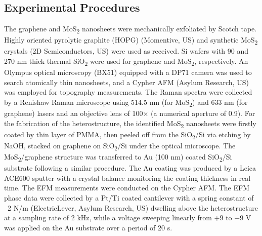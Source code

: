\subsection{Experimental Procedures}
\label{sec:asym-exper-proc}

The graphene and MoS\textsubscript{2} nanosheets were mechanically exfoliated by Scotch tape. Highly oriented pyrolytic graphite (HOPG) (Momentive, US) and synthetic MoS\textsubscript{2} crystals (2D Semiconductors, US) were used as received. Si wafers with 90 and 270 nm thick thermal SiO\textsubscript{2} were used for graphene and MoS\textsubscript{2}, respectively. An Olympus optical microscopy (BX51) equipped with a DP71 camera was used to search atomically thin nanosheets, and a Cypher AFM (Asylum Research, US) was employed for topography measurements. The Raman spectra were collected by a Renishaw Raman microscope using 514.5 nm (for MoS\textsubscript{2}) and 633 nm (for graphene) lasers and an objective lens of 100× (a numerical aperture of 0.9). For the fabrication of the heterostructure, the identified MoS\textsubscript{2} nanosheets were firstly coated by thin layer of PMMA, then peeled off from the SiO\textsubscript{2}/Si via etching by NaOH, stacked on graphene on SiO\textsubscript{2}/Si under the optical microscope. The MoS\textsubscript{2}/graphene structure was transferred to Au (100 nm) coated SiO\textsubscript{2}/Si substrate following a similar procedure. The Au coating was produced by a Leica ACE600 sputter with a crystal balance monitoring the coating thickness in real time. The EFM measurements were conducted on the Cypher AFM. The EFM phase data were collected by a Pt/Ti coated cantilever with a spring constant of ~2 N/m (ElectricLever, Asylum Research, US) dwelling above the heterostructure at a sampling rate of 2 kHz, while a voltage sweeping linearly from +9 to −9 V was applied on the Au substrate over a period of 20 s.

